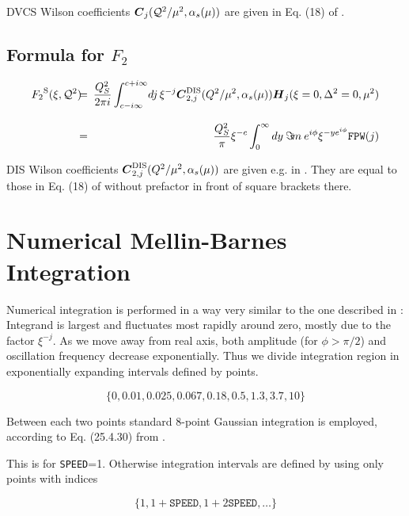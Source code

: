 \documentclass[12pt]{article}
\begin{document}
DVCS Wilson coefficients $\mbox{\boldmath $C$}_{j}({\cal Q}^2/\mu^2,\alpha_s(\mu))$
are given in Eq. (18) of \cite{Kumericki:2006xx}. 

\subsection{Formula for $F_2$}  

\begin{eqnarray*}
{{F_2}^{\rm S}}(\xi,{\cal Q}^2)
&\!\!\!=\!\!\!& \frac{Q_{S}^2}{2 \pi i}\int_{c-i \infty}^{c+ i \infty}\!
dj\,\xi^{-j}
\mbox{\boldmath $C$}^{\rm DIS}_{2,j}(Q^2/\mu^2,\alpha_s(\mu))
\mbox{\boldmath $H$}_{j} (\xi=0,\Delta^2=0,\mu^2) \\[2ex]
&\!\!\!=\!\!\!& \frac{Q_{S}^2}{\pi} \xi^{-c}
\int_{0}^{\infty} dy\: \Im\! m\: e^{i\phi} \xi^{- y e^{i\phi}}
\texttt{FPW}(j)
\label{<F2formula>}
\end{eqnarray*}

DIS Wilson coefficients $\mbox{\boldmath $C$}^{\rm DIS}_{2,j}(Q^2/\mu^2,\alpha_s(\mu))$
are given e.g. in \cite{vanNeerven:2000uj}. They are equal to those in
 Eq. (18) of \cite{Kumericki:2006xx} without prefactor in front of square brackets there.

\section{Numerical Mellin-Barnes Integration}  
\label{sect:Integration}
Numerical integration is performed in a way very similar to the one described in
\cite{Vogt:2004ns}: Integrand is largest and
fluctuates most rapidly around zero, mostly due to the factor $\xi^{-j}$. As we
move away from real axis, both
amplitude (for $\phi > \pi/2$) and oscillation frequency decrease exponentially.
Thus we divide integration region in exponentially expanding intervals
defined by points.

\begin{equation}
 \{0, 0.01, 0.025, 0.067, 0.18, 0.5, 1.3, 3.7, 10\}
\label{<intervals>}
\end{equation}

Between each two points standard 8-point Gaussian integration is employed, according
to Eq. (25.4.30) from \cite{AbS65}.

This is for \texttt{SPEED}=1. Otherwise integration intervals are defined by using
only points with indices

\begin{equation}
 \{ 1, 1 + \texttt{SPEED}, 1 + 2 \texttt{SPEED}, \ldots \}
\label{<speedintervals>}
\end{equation}
\end{document}

